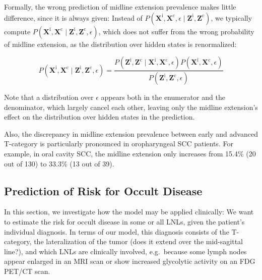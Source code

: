 \documentclass[
  sn-mathphys-num,
]{sn-jnl}
\begin{document}
Formally, the wrong prediction of midline extension prevalence makes
little difference, since it is always given: Instead of
\(P\left( \mathbf{X}^\text{i}, \mathbf{X}^\text{c}, \epsilon \mid \mathbf{Z}^\text{i}, \mathbf{Z}^\text{c} \right)\),
we typically compute
\(P\left( \mathbf{X}^\text{i}, \mathbf{X}^\text{c} \mid \mathbf{Z}^\text{i}, \mathbf{Z}^\text{c}, \epsilon \right)\),
which does not suffer from the wrong probability of midline extension,
as the distribution over hidden states is renormalized:

\[
P \left( \mathbf{X}^\text{i}, \mathbf{X}^\text{c} \mid \mathbf{Z}^\text{i}, \mathbf{Z}^\text{c}, \epsilon \right) = \frac{P \left( \mathbf{Z}^\text{i}, \mathbf{Z}^\text{c} \mid \mathbf{X}^\text{i}, \mathbf{X}^\text{c}, \epsilon \right) P \left( \mathbf{X}^\text{i}, \mathbf{X}^\text{c}, \epsilon \right)}{P \left( \mathbf{Z}^\text{i}, \mathbf{Z}^\text{c}, \epsilon \right)}
\]

Note that a distribution over \(\epsilon\) appears both in the
enumerator and the denominator, which largely cancel each other, leaving
only the midline extension's effect on the distribution over hidden
states in the prediction.

Also, the discrepancy in midline extension prevalence between early and
advanced T-category is particularly pronounced in oropharyngeal SCC
patients. For example, in oral cavity SCC, the midline extension only
increases from 15.4\% (20 out of 130) to 33.3\% (13 out of 39).

\subsection{Prediction of Risk for Occult
Disease}\label{prediction-of-risk-for-occult-disease}

In this section, we investigate how the model may be applied clinically:
We want to estimate the risk for occult disease in some or all LNLs,
given the patient's individual diagnosis. In terms of our model, this
diagnosis consists of the T-category, the lateralization of the tumor
(does it extend over the mid-sagittal line?), and which LNLs are
clinically involved, e.g.~because some lymph nodes appear enlarged in an
MRI scan or show increased glycolytic activity on an FDG PET/CT scan.
\end{document}
